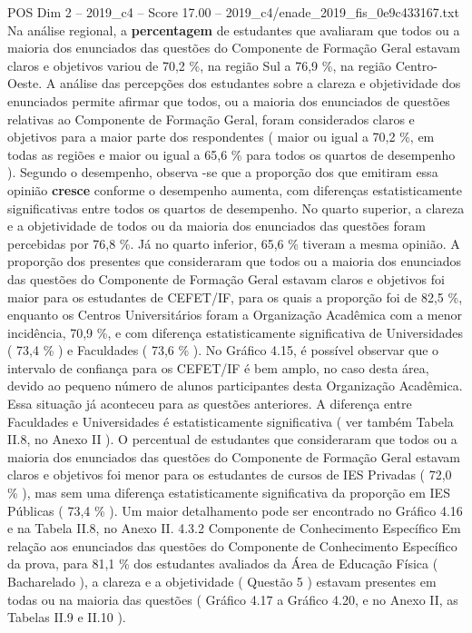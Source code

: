 \begin{textsample}{POS Dim 2 – 2019\_c4 – Score 17.00 – 2019\_c4/enade\_2019\_fis\_0e9c433167.txt}
Na análise regional, a \textbf{percentagem} de estudantes que avaliaram que todos ou a maioria dos enunciados das questões do Componente de Formação Geral estavam claros e objetivos variou de 70,2 \%, na região Sul a 76,9 \%, na região Centro-Oeste.
A análise das percepções dos estudantes sobre a clareza e objetividade dos enunciados permite afirmar que todos, ou a maioria dos enunciados de questões relativas ao Componente de Formação Geral, foram considerados claros e objetivos para a maior parte dos respondentes ( maior ou igual a 70,2 \%, em todas as regiões e maior ou igual a 65,6 \% para todos os quartos de desempenho ).
Segundo o desempenho, observa -se que a proporção dos que emitiram essa opinião \textbf{cresce} conforme o desempenho aumenta, com diferenças estatisticamente significativas entre todos os quartos de desempenho.
No quarto superior, a clareza e a objetividade de todos ou da maioria dos enunciados das questões foram percebidas por 76,8 \%.
Já no quarto inferior, 65,6 \% tiveram a mesma opinião.
A proporção dos presentes que consideraram que todos ou a maioria dos enunciados das questões do Componente de Formação Geral estavam claros e objetivos foi maior para os estudantes de CEFET/IF, para os quais a proporção foi de 82,5 \%, enquanto os Centros Universitários foram a Organização Acadêmica com a menor incidência, 70,9 \%, e com diferença estatisticamente significativa de Universidades ( 73,4 \% ) e Faculdades ( 73,6 \% ).
No Gráfico 4.15, é possível observar que o intervalo de confiança para os CEFET/IF é bem amplo, no caso desta área, devido ao pequeno número de alunos participantes desta Organização Acadêmica.
Essa situação já aconteceu para as questões anteriores.
A diferença entre Faculdades e Universidades é estatisticamente significativa ( ver também Tabela II.8, no Anexo II ).
O percentual de estudantes que consideraram que todos ou a maioria dos enunciados das questões do Componente de Formação Geral estavam claros e objetivos foi menor para os estudantes de cursos de IES Privadas ( 72,0 \% ), mas sem uma diferença estatisticamente significativa da proporção em IES Públicas ( 73,4 \% ).
Um maior detalhamento pode ser encontrado no Gráfico 4.16 e na Tabela II.8, no Anexo II. 4.3.2 Componente de Conhecimento Específico Em relação aos enunciados das questões do Componente de Conhecimento Específico da prova, para 81,1 \% dos estudantes avaliados da Área de Educação Física ( Bacharelado ), a clareza e a objetividade ( Questão 5 ) estavam presentes em todas ou na maioria das questões ( Gráfico 4.17 a Gráfico 4.20, e no Anexo II, as Tabelas II.9 e II.10 ).

\end{textsample}
